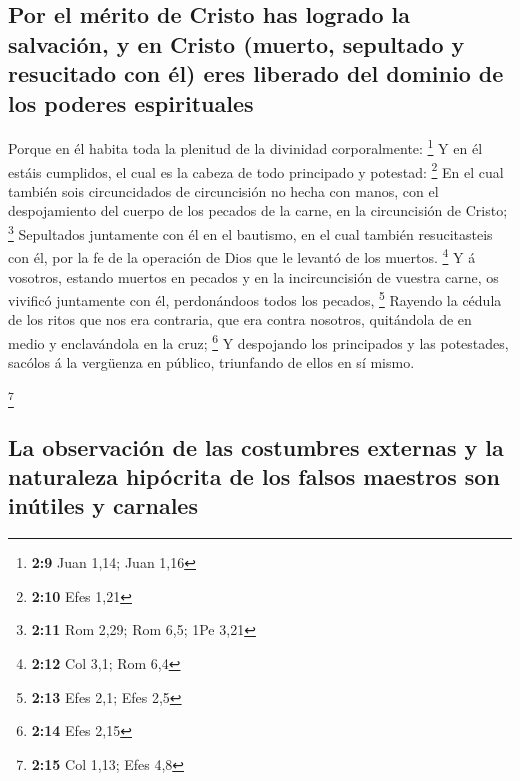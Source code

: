 \hypertarget{por-el-muxe9rito-de-cristo-has-logrado-la-salvaciuxf3n-y-en-cristo-muerto-sepultado-y-resucitado-con-uxe9l-eres-liberado-del-dominio-de-los-poderes-espirituales}{%
\subsection{Por el mérito de Cristo has logrado la salvación, y en
Cristo (muerto, sepultado y resucitado con él) eres liberado del dominio
de los poderes
espirituales}\label{por-el-muxe9rito-de-cristo-has-logrado-la-salvaciuxf3n-y-en-cristo-muerto-sepultado-y-resucitado-con-uxe9l-eres-liberado-del-dominio-de-los-poderes-espirituales}}

 Porque en él habita toda la plenitud de la divinidad
corporalmente: \footnote{\textbf{2:9} Juan 1,14; Juan 1,16}
 Y en él estáis cumplidos, el cual es la cabeza de todo
principado y potestad: \footnote{\textbf{2:10} Efes 1,21}
 En el cual también sois circuncidados de circuncisión no
hecha con manos, con el despojamiento del cuerpo de los pecados de la
carne, en la circuncisión de Cristo; \footnote{\textbf{2:11} Rom 2,29;
  Rom 6,5; 1Pe 3,21}  Sepultados juntamente con él en el
bautismo, en el cual también resucitasteis con él, por la fe de la
operación de Dios que le levantó de los muertos. \footnote{\textbf{2:12}
  Col 3,1; Rom 6,4}  Y á vosotros, estando muertos en
pecados y en la incircuncisión de vuestra carne, os vivificó juntamente
con él, perdonándoos todos los pecados, \footnote{\textbf{2:13} Efes
  2,1; Efes 2,5}  Rayendo la cédula de los ritos que nos
era contraria, que era contra nosotros, quitándola de en medio y
enclavándola en la cruz; \footnote{\textbf{2:14} Efes 2,15}
 Y despojando los principados y las potestades, sacólos á
la vergüenza en público, triunfando de ellos en sí mismo.

\footnote{\textbf{2:15} Col 1,13; Efes 4,8}

\hypertarget{la-observaciuxf3n-de-las-costumbres-externas-y-la-naturaleza-hipuxf3crita-de-los-falsos-maestros-son-inuxfatiles-y-carnales}{%
\subsection{La observación de las costumbres externas y la naturaleza
hipócrita de los falsos maestros son inútiles y
carnales}\label{la-observaciuxf3n-de-las-costumbres-externas-y-la-naturaleza-hipuxf3crita-de-los-falsos-maestros-son-inuxfatiles-y-carnales}}

